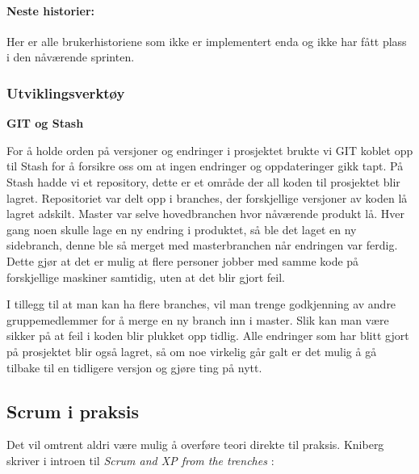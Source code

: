 \documentclass[12pt,a4paper,norsk]{article}
\begin{document}
    \paragraph{Neste historier:}
    Her er alle brukerhistoriene som ikke er implementert enda og ikke har fått plass i den nåværende sprinten.

    \cite [side 72 -78]{kniberg}


  \subsubsection{Utviklingsverktøy}


\bigskip \noindent \textbf{GIT og Stash}
\par For å holde orden på versjoner og endringer i prosjektet brukte vi GIT koblet opp til Stash for å forsikre oss om at ingen endringer og oppdateringer gikk tapt. På Stash hadde vi et repository, dette er et område der all koden til prosjektet blir lagret. Repositoriet var delt opp i branches, der forskjellige versjoner av koden lå lagret adskilt. Master var selve hovedbranchen hvor nåværende produkt lå. Hver gang noen skulle lage en ny endring i produktet, så ble det laget en ny sidebranch, denne ble så merget med masterbranchen når endringen var ferdig. Dette gjør at det er mulig at flere personer jobber med samme kode på forskjellige maskiner samtidig, uten at det blir gjort feil.

I tillegg til at man kan ha flere branches, vil man trenge godkjenning av andre gruppemedlemmer for å merge en ny branch inn i master. Slik kan man være sikker på at feil i koden blir plukket opp tidlig. Alle endringer som har blitt gjort på prosjektet blir også lagret, så om noe virkelig går galt er det mulig å gå tilbake til en tidligere versjon og gjøre ting på nytt.


  \subsection{Scrum i praksis}
    Det vil omtrent aldri være mulig å overføre teori direkte til praksis. Kniberg skriver i introen til \textit{Scrum and XP from the trenches} \cite[side 2]{kniberg}:
\end{document}
